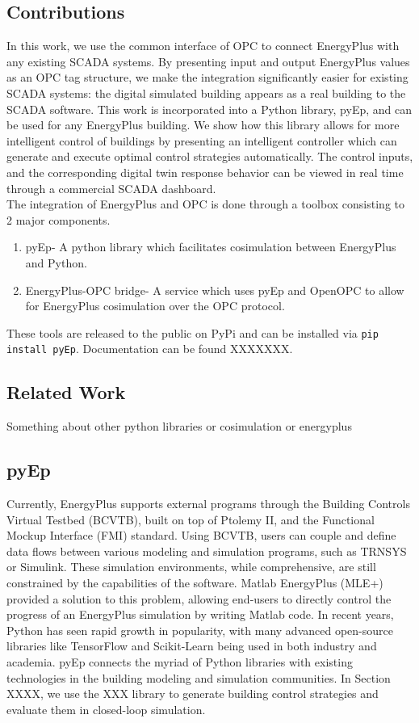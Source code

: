 \subsection{Contributions}
In this work, we use the common interface of OPC to connect EnergyPlus with any existing SCADA systems. By presenting input and output EnergyPlus values as an OPC tag structure, we make the integration significantly easier for existing SCADA systems: the digital simulated building appears as a real building to the SCADA software. This work is incorporated into a Python library, pyEp, and can be used for any EnergyPlus building. We show how this library allows for more intelligent control of buildings by presenting an intelligent controller which can generate and execute optimal control strategies automatically. The control inputs, and the corresponding digital twin response behavior can be viewed in real time through a commercial SCADA dashboard.\\
The integration of EnergyPlus and OPC is done through a toolbox consisting to 2 major components.
\begin{enumerate}
	\item pyEp- A python library which facilitates cosimulation between EnergyPlus and Python. 
	\item EnergyPlus-OPC bridge- A service which uses pyEp and OpenOPC to allow for EnergyPlus cosimulation over the OPC protocol.
\end{enumerate}
These tools are released to the public on PyPi and can be installed via 
\lstinline[language=bash]{pip install pyEp}. Documentation can be found XXXXXXX.

\subsection{Related Work}
Something about other python libraries or cosimulation or energyplus
\subsection{pyEp}

Currently, EnergyPlus supports external programs through the Building Controls Virtual Testbed (BCVTB), built on top of Ptolemy II, and the Functional Mockup Interface (FMI) standard. Using BCVTB, users can couple and define data flows between various modeling and simulation programs, such as TRNSYS or Simulink. These simulation environments, while comprehensive, are still constrained by the capabilities of the software. Matlab EnergyPlus (MLE+) provided a solution to this problem, allowing end-users to directly control the progress of an EnergyPlus simulation by writing Matlab code. In recent years, Python has seen rapid growth in popularity, with many advanced open-source libraries like TensorFlow and Scikit-Learn being used in both industry and academia. pyEp connects the myriad of Python libraries with existing technologies in the building modeling and simulation communities. In Section XXXX, we use the XXX library to generate building control strategies and evaluate them in closed-loop simulation.

